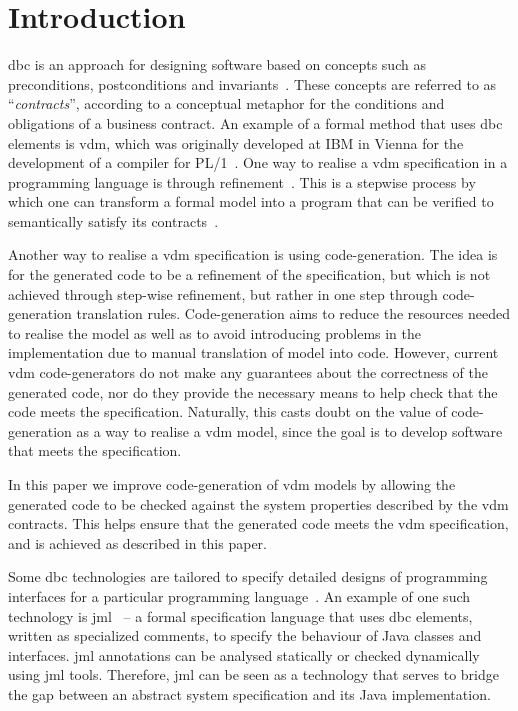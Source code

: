 \section{Introduction}
\label{sec:intro}

\ac{dbc} is an approach for designing software based on concepts such
as preconditions, postconditions and invariants~\cite{Meyer88}. These
concepts are referred to as ``\emph{contracts}'', according to a
conceptual metaphor for the conditions and obligations of a business
contract. An example of a formal method that uses \ac{dbc} elements is
\ac{vdm}, which was originally developed at IBM in Vienna for the
development of a compiler for
PL/1~\cite{Bjorner&78,Fitzgerald&08c,Fitzgerald&09}. One way to
realise a \ac{vdm} specification in a programming language is through
refinement~\cite{Woodcock&96}. This is a stepwise process by which one
can transform a formal model into a program that can be verified to
semantically satisfy its contracts~\cite{SDRA}.

Another way to realise a \ac{vdm} specification is using
code-generation. The idea is for the generated code to be a refinement
of the specification, but which is not achieved through step-wise
refinement, but rather in one step through code-generation translation
rules. Code-generation aims to reduce the resources needed to realise
the model as well as to avoid introducing problems in the
implementation due to manual translation of model into code. However,
current \ac{vdm} code-generators do not make any guarantees about the
correctness of the generated code, nor do they provide the necessary
means to help check that the code meets the specification. Naturally,
this casts doubt on the value of code-generation as a way to realise a
\ac{vdm} model, since the goal is to develop software that meets the
specification.

In this paper we improve code-generation of \ac{vdm} models by
allowing the generated code to be checked against the system
properties described by the \ac{vdm} contracts. This helps ensure that
the generated code meets the \ac{vdm} specification, and is achieved
as described in this paper.

Some \ac{dbc} technologies are tailored to specify detailed designs of
programming interfaces for a particular programming
language~\cite{Wing87}. An example of one such technology is
\ac{jml}~\cite{Burdy&05} -- a formal specification language that uses
\ac{dbc} elements, written as specialized comments, to specify the
behaviour of Java classes and interfaces. \ac{jml} annotations can be
analysed statically or checked dynamically using \ac{jml} tools.
Therefore, \ac{jml} can be seen as a technology that serves to bridge
the gap between an abstract system specification and its Java
implementation.

